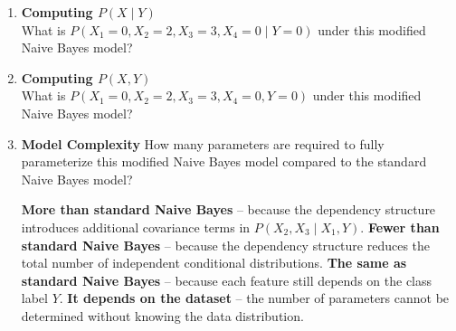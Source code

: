 \documentclass[12pt,letterpaper, onecolumn]{exam}
\begin{document}
\begin{questions}
\begin{enumerate}[label=(\alph*)]
    \item \textbf{Computing \( P(X \mid Y) \)} \\
What is \( P(X_1=0, X_2=2, X_3=3, X_4=0 \mid Y=0)\) under this modified Naive Bayes model?
    \begin{choices}
    \end{choices}
    \item \textbf{Computing \( P(X, Y) \)} \\
What is \( P(X_1=0, X_2=2, X_3=3, X_4=0, Y=0)\) under this modified Naive Bayes model?
    \begin{choices}
\end{choices}

    \item \textbf{Model Complexity}
How many parameters are required to fully parameterize this modified Naive Bayes model compared to the standard Naive Bayes model?
\begin{choices}
    \choice \textbf{More than standard Naive Bayes} – because the dependency structure introduces additional covariance terms in \( P(X_2, X_3 \mid X_1, Y) \).
    \choice \textbf{Fewer than standard Naive Bayes} – because the dependency structure reduces the total number of independent conditional distributions.
    \choice \textbf{The same as standard Naive Bayes} – because each feature still depends on the class label \( Y \).
    \choice \textbf{It depends on the dataset} – the number of parameters cannot be determined without knowing the data distribution.
\end{choices}
\end{enumerate}


\begin{solution}
    \begin{parts}
        \part
        \part
        \part
    \end{parts}
\end{solution}



\end{questions}
\end{document}

